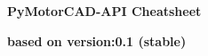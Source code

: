 \documentclass[landscape]{article}
\begin{document}
\raggedright
\footnotesize
\begin{center}
     \Huge{\textbf{PyMotorCAD-API Cheatsheet}} 
\end{center}
\begin{center}
	\small{\textbf{based on version:0.1 (stable)}} 
\end{center}
\vspace{-0.15cm}
\noindent\makebox[\linewidth]{\rule{\paperwidth}{2pt}}
\end{document}
